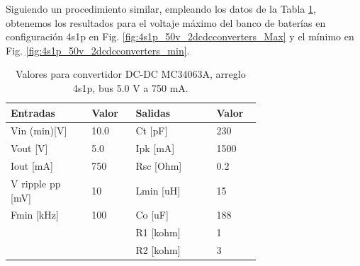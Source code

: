 Siguiendo un procedimiento similar, empleando los datos de la Tabla \ref{tab:valores_50_4s1p}, obtenemos los resultados para el voltaje máximo del banco de baterías en configuración 4s1p en Fig. \ref{fig:4s1p_50v_2dcdcconverters_Max} y el mínimo en Fig. \ref{fig:4s1p_50v_2dcdcconverters_min}.

\begin{table}[h]
    \centering
    \begin{tabular}{p{0.25\linewidth}p{0.1\linewidth}p{0.25\linewidth}p{0.1\linewidth}}
    \hline
    \textbf{Entradas} & \textbf{Valor} & \textbf{Salidas} & \textbf{Valor} \\ \hline
    Vin (min)[V] & 10.0 & Ct [pF] & 230 \\
    Vout [V] & 5.0 & Ipk [mA] & 1500 \\
    Iout [mA] & 750 & Rsc [Ohm] & 0.2 \\
    V ripple pp [mV] & 10 & Lmin [uH] & 15 \\
    Fmin [kHz] & 100 & Co [uF] & 188 \\
    ~ & ~ & R1 [kohm] & 1 \\
    ~ & ~ & R2 [kohm] & 3 \\ \hline
    \end{tabular}
\caption{Valores para convertidor DC-DC MC34063A, arreglo 4s1p, bus 5.0 V a 750 mA.}
\label{tab:valores_50_4s1p}
\end{table}



